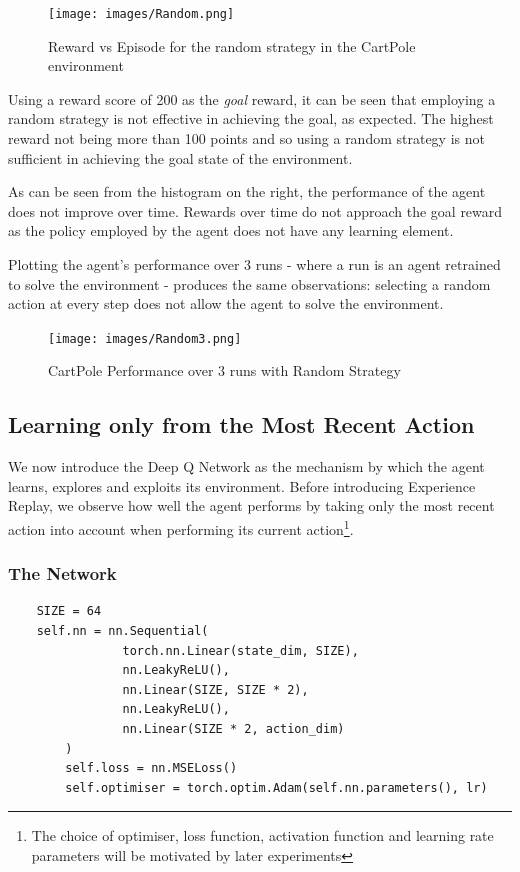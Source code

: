 \documentclass{article}
\begin{document}
\begin{figure}[H]
    \centering
    \texttt{[image: images/Random.png]}
    \caption{Reward vs Episode for the random strategy in the CartPole environment}
    \label{fig:cartpole_random}
\end{figure}

Using a reward score of 200 as the \textit{goal} reward, it can be seen that employing a random strategy is not effective in achieving the goal, as expected. The highest reward not being more than 100 points and so using a random strategy is not sufficient in achieving the goal state of the environment. 

As can be seen from the histogram on the right, the performance of the agent does not improve over time. Rewards over time do not approach the goal reward as the policy employed by the agent does not have any learning element.

Plotting the agent's performance over 3 runs - where a run is an agent retrained to solve the environment - produces the same observations: selecting a random action at every step does not allow the agent to solve the environment.

\begin{figure} [H]
    \centering
    \texttt{[image: images/Random3.png]}
    \caption{CartPole Performance over 3 runs with Random Strategy}
    \label{fig:random_10}
\end{figure}

\subsection{Learning only from the Most Recent Action}

We now introduce the Deep Q Network as the mechanism by which the agent learns, explores and exploits its environment. Before introducing Experience Replay, we observe how well the agent performs by taking only the most recent action into account when performing its current action\footnote{The choice of optimiser, loss function, activation function and learning rate parameters will be motivated by later experiments}.

\subsubsection{The Network}

\begin{verbatim}
    SIZE = 64
    self.nn = nn.Sequential(
                torch.nn.Linear(state_dim, SIZE),
                nn.LeakyReLU(),
                nn.Linear(SIZE, SIZE * 2),
                nn.LeakyReLU(),
                nn.Linear(SIZE * 2, action_dim)
        )
        self.loss = nn.MSELoss()
        self.optimiser = torch.optim.Adam(self.nn.parameters(), lr)
\end{verbatim}
\end{document}
